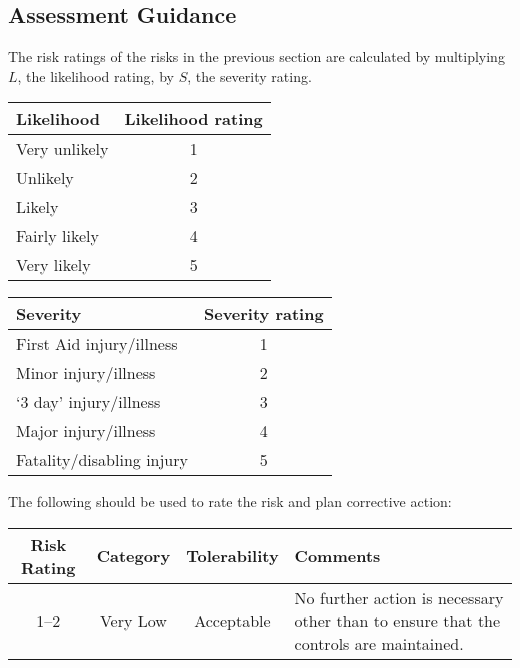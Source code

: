 \documentclass[12pt,a4paper]{scrartcl}
\begin{document}
\begin{landscape}

\section{Assessment Guidance}

The risk ratings of the risks in the previous section are calculated by multiplying $L$, the likelihood rating, by $S$, the severity rating.

\bigskip
\begin{minipage}[b]{0.5\linewidth}
\begin{tabular}[c]{lc}
  \toprule
  \textbf{Likelihood} & \textbf{Likelihood rating} \\
  \midrule
  Very unlikely & 1 \\
  Unlikely & 2 \\
  Likely & 3 \\
  Fairly likely & 4 \\
  Very likely & 5 \\
  \bottomrule
\end{tabular}
\end{minipage}
\begin{minipage}[b]{0.5\linewidth}
\begin{tabular}[c]{lc}
  \toprule
  \textbf{Severity} & \textbf{Severity rating} \\
  \midrule
  First Aid injury/illness & 1 \\
  Minor injury/illness & 2 \\
  `3 day' injury/illness & 3 \\
  Major injury/illness & 4 \\
  Fatality/disabling injury & 5 \\
  \bottomrule
\end{tabular}
\end{minipage}
\bigskip

The following should be used to rate the risk and plan corrective action:
\bigskip
\newcommand{\riskinfo}[4]{
  #1 & #2 & #3 & #4 \\
}

\begin{tabular*}{\linewidth}[c]{cccp{33em}}
  \toprule
  \textbf{Risk Rating} & \textbf{Category} & \textbf{Tolerability} & \textbf{Comments} \\
  \midrule

  \riskinfo{1--2}{Very Low}{Acceptable}
  {No further action is necessary other than to ensure that the controls are maintained.}


\end{tabular*}
\end{landscape}
\end{document}
